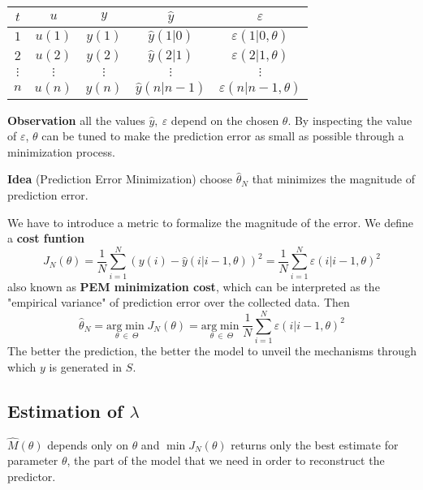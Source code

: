 \begin{center}

\begin{tabular}{ccccc}
\toprule 
 $ t$ & $ u$ & $ y$ & $ \hat{y}$ & $ \varepsilon $ \\
\midrule 
 $ 1$ & $ u( 1)$ & $ y( 1)$ & $ \hat{y}( 1|0)$ & $ \varepsilon ( 1|0,\theta )$ \\
$ 2$ & $ u( 2)$ & $ y( 2)$ & $ \hat{y}( 2|1)$ & $ \varepsilon ( 2|1,\theta )$ \\
$ \vdots $ & $ \vdots $ & $ \vdots $ & $ \vdots $ & $ \vdots $ \\
$ n$ & $ u( n)$ & $ y( n)$ & $ \hat{y}( n|n-1)$ & $ \varepsilon ( n|n-1,\theta )$ \\
 \bottomrule
\end{tabular}
\end{center}

\textbf{Observation}
all the values $ \hat{y} ,\ \varepsilon $ depend on the chosen $ \theta $. By inspecting the value of $ \varepsilon $, $ \theta $ can be tuned to make the prediction error as small as possible through a minimization process.

\textbf{Idea} (Prediction Error Minimization)
choose $ \hat{\theta }_{N}$ that minimizes the magnitude of prediction error.

We have to introduce a metric to formalize the magnitude of the error. We define a \textbf{cost funtion} 
\begin{equation*}
J_{N}( \theta ) =\frac{1}{N}\sum _{i=1}^{N}( y( i) -\hat{y}( i|i-1,\theta ))^{2} =\frac{1}{N}\sum _{i=1}^{N} \varepsilon ( i|i-1,\theta )^{2}
\end{equation*}
also known as \textbf{PEM minimization cost}, which can be interpreted as the "empirical variance" of prediction error over the collected data. Then 
\begin{equation*}
\hat{\theta }_{N} =\underset{\theta \ \in \ \Theta }{\mathrm{arg}\min} J_{N}( \theta ) =\underset{\theta \ \in \ \Theta }{\mathrm{arg}\min}\frac{1}{N}\sum _{i=1}^{N} \varepsilon ( i|i-1,\theta )^{2}
\end{equation*}
The better the prediction, the better the model to unveil the mechanisms through which $ y$ is generated in $ S$. 

\subsection{Estimation of $\lambda$}

$ \hat{M}( \theta )$ depends only on $ \theta $ and $ \min J_{N}( \theta )$ returns only the best estimate for  parameter $ \theta $, the part of the model that we need in order to reconstruct the predictor.

